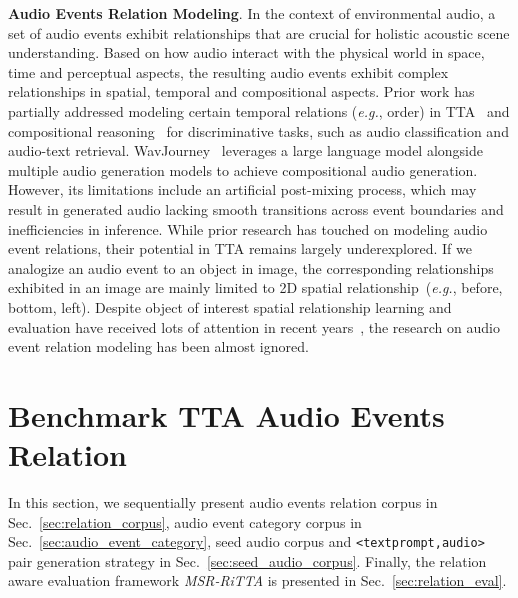 \textbf{Audio Events Relation Modeling}. In the context of environmental audio, a set of audio events exhibit relationships that are crucial for holistic acoustic scene understanding. 
Based on how audio interact with the physical world in space, time and perceptual aspects, the resulting audio events exhibit complex relationships in spatial, temporal and compositional aspects. Prior work has partially addressed modeling certain temporal relations (\textit{e.g.}, order) in TTA~\citep{audiotime} and compositional reasoning~\citep{ghosh2024compa} for discriminative tasks, such as audio classification and audio-text retrieval. WavJourney~\citep{liu2023wavjourney} leverages a large language model alongside multiple audio generation models to achieve compositional audio generation. However, its limitations include an artificial post-mixing process, which may result in generated audio lacking smooth transitions across event boundaries and inefficiencies in inference. While prior research has touched on modeling audio event relations, their potential in TTA remains largely underexplored. If we analogize an audio event to an object in image, the corresponding relationships exhibited in an image are mainly limited to 2D spatial relationship~(\textit{e.g.}, before, bottom, left). Despite object of interest spatial relationship learning and evaluation have received lots of attention in recent years~\citep{Krishna2016VisualGC,gokhale2022benchmarking,compos_ability}, the research on audio event relation modeling has been almost ignored.\section{Benchmark TTA Audio Events Relation}
\vspace{-3mm}

In this section, we sequentially present audio events relation corpus in Sec.~\ref{sec:relation_corpus}, audio event category corpus in Sec.~\ref{sec:audio_event_category}, seed audio corpus and \texttt{<textprompt,audio>} pair generation strategy in Sec.~\ref{sec:seed_audio_corpus}. Finally, the relation aware evaluation framework \emph{MSR-RiTTA} is presented in Sec.~\ref{sec:relation_eval}.
\vspace{-2mm}


